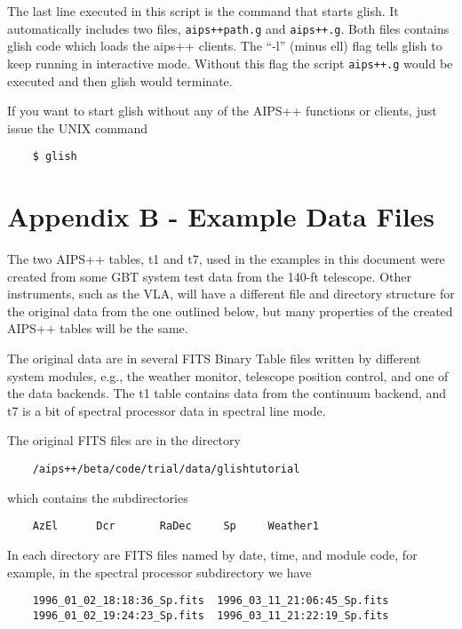 The last line executed in this script is the command that starts 
glish.  It automatically includes two files, \verb!aips++path.g! and
\verb!aips++.g!.
Both files contains glish
code which loads the aips++ clients.  The ``-l'' (minus ell) flag tells glish
to keep running in interactive mode.  Without this flag the script \verb!aips++.g!
would be executed and then glish would terminate.

    If you want to start glish without any of the AIPS++ functions or
clients, just issue the UNIX command

\begin{verbatim}
	$ glish
\end{verbatim}

\section{Appendix B - Example Data Files}

    The two AIPS++ tables, t1 and t7, used in the examples in this document
were created from some GBT system test data from the 140-ft telescope.
Other instruments, such as the VLA, will have a different file and
directory structure for the original data from the one outlined below, but
many properties of the created AIPS++ tables will be the same.

    The original data are in several FITS Binary Table files written by
different system modules, e.g., the weather monitor, telescope position
control, and one of the data backends.  The t1 table contains data from the
continuum backend, and t7 is a bit of spectral processor data in spectral
line mode.

    The original FITS files are in the directory

\begin{verbatim}
	/aips++/beta/code/trial/data/glishtutorial
\end{verbatim}

which contains the subdirectories

\begin{verbatim}
	AzEl      Dcr       RaDec     Sp     Weather1
\end{verbatim}

    In each directory are FITS files named by date, time, and module code,
for example, in the spectral processor subdirectory we have

\begin{verbatim}
	1996_01_02_18:18:36_Sp.fits  1996_03_11_21:06:45_Sp.fits
	1996_01_02_19:24:23_Sp.fits  1996_03_11_21:22:19_Sp.fits
\end{verbatim}


